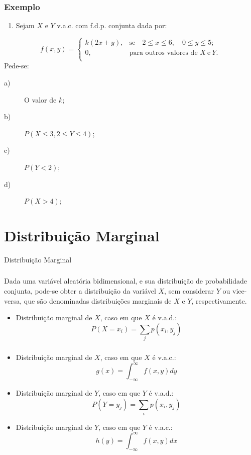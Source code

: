\documentclass[14pt,aspectratio=1610]{beamer}
\begin{document}
\begin{frame}{}
\frametitle{Exemplo}
\begin{block}{}
\vspace{-1cm}
\begin{enumerate}
\item Sejam $X$ e $Y$ v.a.c. com f.d.p. conjunta dada por:
\end{enumerate}
$$
f(x,y)=\left\{
\begin{array}{ccc}
k(2x+y),& \textrm{se}\quad 2\leq x\leq 6,\quad 0\leq y\leq 5;\\
0,& \textrm{para outros valores de\ }X\ \textrm{e}\ Y.\\
\end{array}
\right.
$$
Pede-se:
\begin{description}
\item[a)] O valor de $k$;
\item[b)] $P(X\leq 3, 2\leq Y \leq 4)$;
\item[c)] $P(Y<2)$;
\item[d)] $P(X>4)$;
\end{description}
\end{block}
\end{frame}

\section{Distribuição Marginal}
\begin{frame}{Distribuição Marginal}
\frametitle{}
\begin{block}{}
\justifying
Dada uma variável aleatória bidimensional, e sua distribuição de probabilidade conjunta, pode-se obter a distribuição da variável $X$, sem considerar $Y$ ou vice-versa, 
que são denominadas distribuições marginais de $X$ e $Y$, respectivamente.

\begin{itemize}
\item Distribuição marginal de $X$, caso em que $X$ é v.a.d.:
$$\displaystyle P(X=x_{i})=\sum_{j}p(x_{i},y_{j})$$
\end{itemize}
\end{block}
\end{frame}

\begin{frame}{}
\frametitle{}
\begin{block}{}
\begin{itemize}
\item Distribuição marginal de $X$, caso em que $X$ é v.a.c.:
$$\displaystyle g(x)=\int_{-\infty}^{\infty} f(x,y)dy$$\pause
\vspace{-0.5cm}
\item Distribuição marginal de $Y$, caso em que $Y$ é v.a.d.:
$$\displaystyle P(Y=y_{j})=\sum_{i}p(x_{i},y_{j})$$\pause
\vspace{-0.5cm}
\item Distribuição marginal de $Y$, caso em que $Y$ é v.a.c.:
$$\displaystyle h(y)=\int_{-\infty}^{\infty} f(x,y)dx$$
\end{itemize}
\end{block}
\end{frame}
\end{document}
